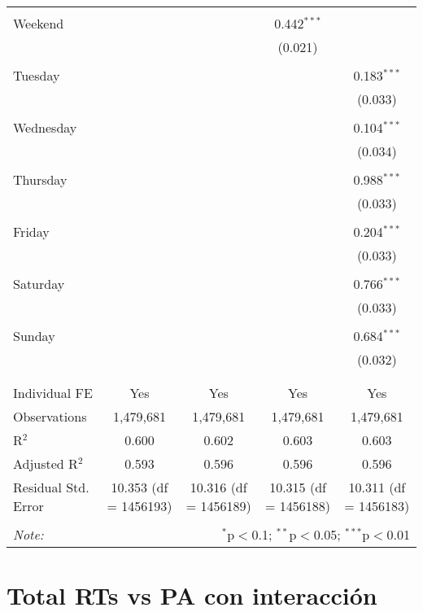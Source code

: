 \documentclass[
]{article}
\begin{document}
\begin{table}[!htbp]
{\begin{tabular}{@{\extracolsep{5pt}}lcccc}
  & & & & \\ 
 Weekend &  &  & 0.442$^{***}$ &  \\ 
  &  &  & (0.021) &  \\ 
  & & & & \\ 
 Tuesday &  &  &  & 0.183$^{***}$ \\ 
  &  &  &  & (0.033) \\ 
  & & & & \\ 
 Wednesday &  &  &  & 0.104$^{***}$ \\ 
  &  &  &  & (0.034) \\ 
  & & & & \\ 
 Thursday &  &  &  & 0.988$^{***}$ \\ 
  &  &  &  & (0.033) \\ 
  & & & & \\ 
 Friday &  &  &  & 0.204$^{***}$ \\ 
  &  &  &  & (0.033) \\ 
  & & & & \\ 
 Saturday &  &  &  & 0.766$^{***}$ \\ 
  &  &  &  & (0.033) \\ 
  & & & & \\ 
 Sunday &  &  &  & 0.684$^{***}$ \\ 
  &  &  &  & (0.032) \\ 
  & & & & \\ 
\hline \\[-1.8ex] 
Individual FE & Yes & Yes & Yes & Yes \\ 
Observations & 1,479,681 & 1,479,681 & 1,479,681 & 1,479,681 \\ 
R$^{2}$ & 0.600 & 0.602 & 0.603 & 0.603 \\ 
Adjusted R$^{2}$ & 0.593 & 0.596 & 0.596 & 0.596 \\ 
Residual Std. Error & 10.353 (df = 1456193) & 10.316 (df = 1456189) & 10.315 (df = 1456188) & 10.311 (df = 1456183) \\ 
\hline 
\hline \\[-1.8ex] 
\textit{Note:}  & \multicolumn{4}{r}{$^{*}$p$<$0.1; $^{**}$p$<$0.05; $^{***}$p$<$0.01} \\ 
\end{tabular}
} 
\end{table} 
\newpage
\section{Total RTs vs PA con interacción}
\end{document}
